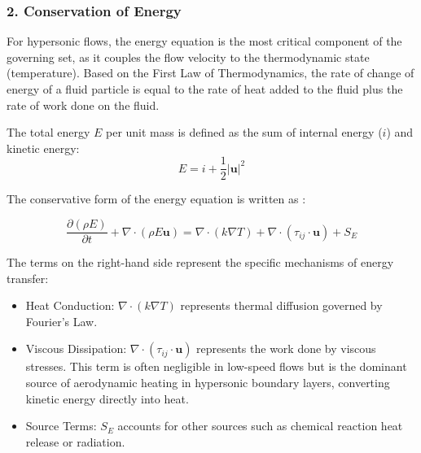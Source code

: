\subsubsection*{2. Conservation of Energy}
For hypersonic flows, the energy equation is the most critical component of the governing set, as it couples the flow velocity to the thermodynamic state (temperature). Based on the First Law of Thermodynamics, the rate of change of energy of a fluid particle is equal to the rate of heat added to the fluid plus the rate of work done on the fluid.

The total energy $E$ per unit mass is defined as the sum of internal energy ($i$) and kinetic energy:
\begin{equation}
    E = i + \frac{1}{2} |\mathbf{u}|^2
\end{equation}

The conservative form of the energy equation is written as \cite{versteeg2007cfd}:

\begin{equation}
    \frac{\partial (\rho E)}{\partial t} + \nabla \cdot (\rho E \mathbf{u}) = \nabla \cdot (k \nabla T) + \nabla \cdot (\tau_{ij} \cdot \mathbf{u}) + S_E
\end{equation}

The terms on the right-hand side represent the specific mechanisms of energy transfer:
\begin{itemize}
    \item Heat Conduction: $\nabla \cdot (k \nabla T)$ represents thermal diffusion governed by Fourier's Law.
    \item Viscous Dissipation: $\nabla \cdot (\tau_{ij} \cdot \mathbf{u})$ represents the work done by viscous stresses. This term is often negligible in low-speed flows but is the dominant source of aerodynamic heating in hypersonic boundary layers, converting kinetic energy directly into heat.
    \item Source Terms: $S_E$ accounts for other sources such as chemical reaction heat release or radiation.
\end{itemize}


